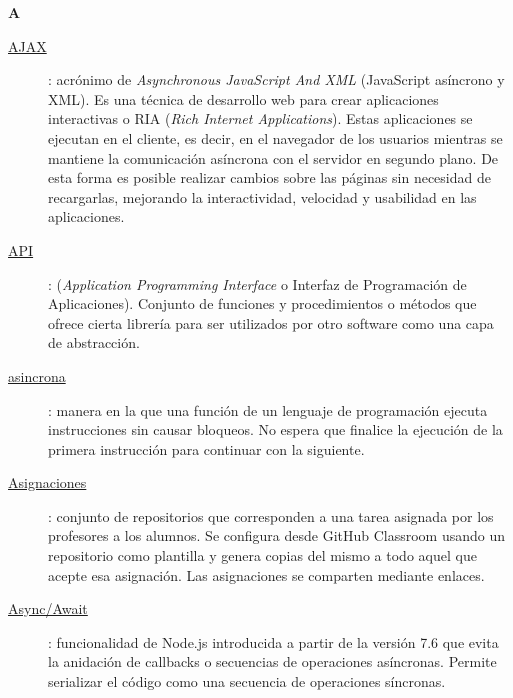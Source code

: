 {\bfseries {\Huge A}}\label{Apendice1:A}
\bigskip
\bigskip

\begin{description}
  \item[\underline{AJAX}\label{apend1:ajax}]: acrónimo de \textit{Asynchronous JavaScript And XML} (JavaScript asíncrono y XML). Es una técnica de desarrollo web para crear aplicaciones interactivas o RIA (\textit{Rich Internet Applications}). Estas aplicaciones se ejecutan en el cliente, es decir, en el navegador de los usuarios mientras se 
  mantiene la comunicación asíncrona con el servidor en segundo plano. De esta forma es posible realizar cambios sobre las páginas sin necesidad de recargarlas, mejorando la interactividad, velocidad y usabilidad en las aplicaciones.
  \bigskip
\end{description}

\begin{description}
  \item[\underline{API}\label{apend1:api}]: (\textit{Application Programming Interface} o Interfaz de Programación de Aplicaciones). Conjunto de funciones y procedimientos o métodos que ofrece cierta librería para ser utilizados por otro software como una capa de abstracción. 
  \bigskip
\end{description}

\begin{description}
  \item[\underline{asincrona}\label{apend1:asincrona}]: manera en la que una función de un lenguaje de programación ejecuta instrucciones sin causar bloqueos. No espera que finalice la ejecución de la primera instrucción para continuar con la siguiente.
  \bigskip
\end{description}

\begin{description}
  \item[\underline{Asignaciones}\label{apend1:asignaciones}]: conjunto de repositorios que corresponden a una tarea asignada por los profesores a los alumnos. Se configura desde GitHub Classroom usando un repositorio como plantilla y genera copias del mismo a todo aquel que acepte esa asignación. Las asignaciones se comparten mediante enlaces.
  \bigskip
\end{description}

\begin{description}
  \item[\underline{Async/Await}\label{apend1:async-await}]: funcionalidad de Node.js introducida a partir de la versión 7.6 que evita la anidación de callbacks o secuencias de operaciones asíncronas. Permite serializar el código como una secuencia de operaciones síncronas.
  \bigskip
\end{description}


